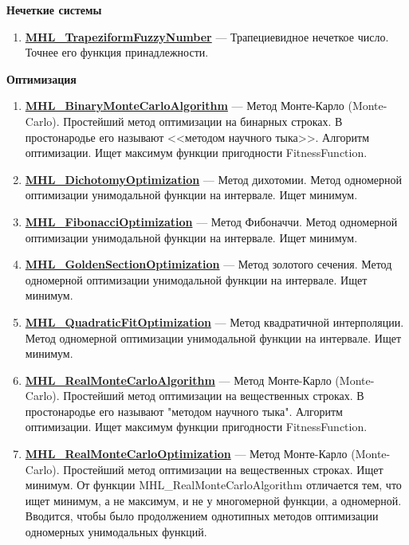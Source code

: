 \documentclass[a4paper,12pt]{article}
\begin{document}
\textbf{Нечеткие системы}
\begin{enumerate}

\item \textbf{\hyperref[MHL_TrapeziformFuzzyNumber]{MHL\_TrapeziformFuzzyNumber}} --- Трапециевидное нечеткое число. Точнее его функция принадлежности.

\end{enumerate}

\textbf{Оптимизация}
\begin{enumerate}

\item \textbf{\hyperref[MHL_BinaryMonteCarloAlgorithm]{MHL\_BinaryMonteCarloAlgorithm}} --- Метод Монте-Карло (Monte-Carlo). Простейший метод оптимизации на бинарных строках. В простонародье его называют <<методом научного тыка>>. Алгоритм оптимизации. Ищет максимум функции пригодности FitnessFunction.

\item \textbf{\hyperref[MHL_DichotomyOptimization]{MHL\_DichotomyOptimization}} --- Метод дихотомии. Метод одномерной оптимизации унимодальной функции на интервале. Ищет минимум.

\item \textbf{\hyperref[MHL_FibonacciOptimization]{MHL\_FibonacciOptimization}} --- Метод Фибоначчи. Метод одномерной оптимизации унимодальной функции на интервале. Ищет минимум.

\item \textbf{\hyperref[MHL_GoldenSectionOptimization]{MHL\_GoldenSectionOptimization}} --- Метод золотого сечения. Метод одномерной оптимизации унимодальной функции на интервале. Ищет минимум.

\item \textbf{\hyperref[MHL_QuadraticFitOptimization]{MHL\_QuadraticFitOptimization}} --- Метод квадратичной интерполяции. Метод одномерной оптимизации унимодальной функции на интервале. Ищет минимум.

\item \textbf{\hyperref[MHL_RealMonteCarloAlgorithm]{MHL\_RealMonteCarloAlgorithm}} --- Метод Монте-Карло (Monte-Carlo). Простейший метод оптимизации на вещественных строках. В простонародье его называют "методом научного тыка".
Алгоритм оптимизации. Ищет максимум функции пригодности FitnessFunction.

\item \textbf{\hyperref[MHL_RealMonteCarloOptimization]{MHL\_RealMonteCarloOptimization}} --- Метод Монте-Карло (Monte-Carlo). Простейший метод оптимизации на вещественных строках. Ищет минимум. От функции MHL\_RealMonteCarloAlgorithm отличается тем, что ищет минимум, а не максимум, и не у многомерной функции, а одномерной. Вводится, чтобы было продолжением однотипных методов оптимизации одномерных унимодальных функций.


\end{enumerate}
\end{document}
